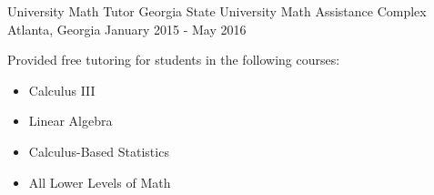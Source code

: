\begin{cventries}
\cventry
{University Math Tutor} %
{Georgia State University Math Assistance Complex} %
{Atlanta, Georgia} %
{January 2015 - May 2016} %
{ %
\begin{cvitems}
\item {Provided free tutoring for students in the following courses:}
\begin{itemize}
\item {Calculus III}
\item {Linear Algebra}
\item {Calculus-Based Statistics}
\item {All Lower Levels of Math}
\end{itemize}
\end{cvitems}
}


\end{cventries}
